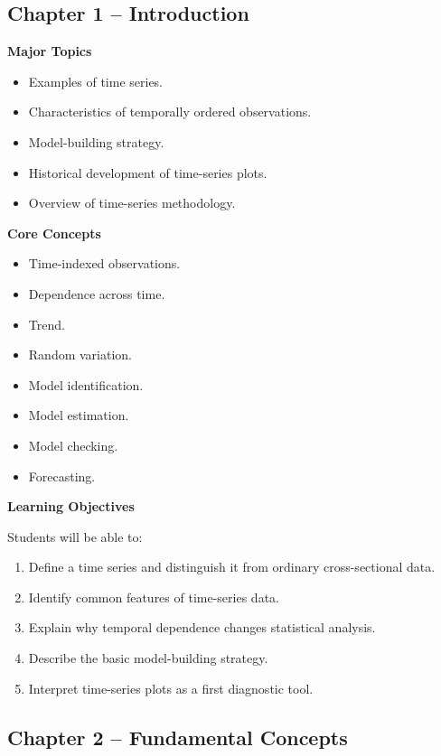 \documentclass[11pt,a4paper]{article}
\begin{document}
\subsection{Chapter 1 -- Introduction}

\textbf{Major Topics}

\begin{itemize}
    \item Examples of time series.
    \item Characteristics of temporally ordered observations.
    \item Model-building strategy.
    \item Historical development of time-series plots.
    \item Overview of time-series methodology.
\end{itemize}

\textbf{Core Concepts}

\begin{itemize}
    \item Time-indexed observations.
    \item Dependence across time.
    \item Trend.
    \item Random variation.
    \item Model identification.
    \item Model estimation.
    \item Model checking.
    \item Forecasting.
\end{itemize}

\textbf{Learning Objectives}

Students will be able to:

\begin{enumerate}
    \item Define a time series and distinguish it from ordinary cross-sectional
          data.
    \item Identify common features of time-series data.
    \item Explain why temporal dependence changes statistical analysis.
    \item Describe the basic model-building strategy.
    \item Interpret time-series plots as a first diagnostic tool.
\end{enumerate}

\subsection{Chapter 2 -- Fundamental Concepts}
\end{document}
